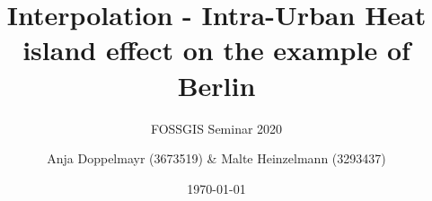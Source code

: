 \documentclass[a4paper,listof=totoc,toc=sectionentrywithdots,abstract=false]{scrartcl}
\title{Interpolation - Intra-Urban Heat island effect on the example of Berlin}
\subtitle{FOSSGIS Seminar 2020}
\date{\today}
\author{Anja Doppelmayr (3673519) \& Malte Heinzelmann (3293437)}
\affil{Ruprecht-Karls-Universit\"at Heidelberg}
\begin{document}
\maketitle


\begin{abstract}
	\setlength{\parindent}{0pt}
	
\end{abstract}

\pagebreak






\pagebreak
\appendix
\printbibliography
\end{document}

